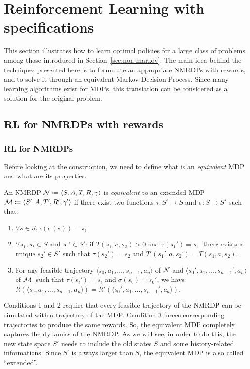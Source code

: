 \section[Reinforcement Learning with LDLf specifications]%
{Reinforcement Learning with \ldl{} specifications}

This section illustrates how to learn optimal policies for a large class of
problems among those introduced in Section~\ref{sec:non-markov}. The main idea
behind the techniques presented here is to formulate an appropriate NMRDPs
with \ldl{} rewards, and to solve it through an equivalent Markov Decision
Process. Since many learning algorithms exist for MDPs, this translation can
be considered as a solution for the original problem.


\subsection[RL for NMRDPs with LDLf rewards]%
{RL for NMRDPs with \ldl{} rewards}

\label{sec:nmrdp-solution}

\subsubsection*{RL for NMRDPs}

Before looking at the construction, we need to define what is an
\emph{equivalent} MDP and what are its properties.

\begin{definition}
	\cite{bib:nmrdp-logic-first} An NMRDP $\mathcal{N} \coloneqq \langle S, A, T, R,
	\gamma \rangle$ is \emph{equivalent} to an extended MDP $\mathcal{M} \coloneqq
	\langle S', A, T', R', \gamma' \rangle$ if there exist two functions
	$\tau: S' \to S$ and $\sigma: S \to S'$ such that:
	\begin{enumerate}
		\item $\forall s \in S : \tau(\sigma(s)) = s$;
		\item $\forall s_1, s_2 \in S$ and $s_1' \in S'$: if $T(s_1, a, s_2) > 0$
			and $\tau(s_1') = s_1$, there exists a unique $s_2' \in S'$ such that
			$\tau(s_2') = s_2$ and $T'(s_1', a, s_2') = T(s_1, a, s_2)$.
		\item For any feasible trajectory $\langle s_0, a_1, \dots, s_{n-1}, a_n
			\rangle$ of $\mathcal{N}$ and $\langle s_0', a_1, \dots, s_{n-1}', a_n
			\rangle$ of $\mathcal{M}$, such that $\tau(s_i') = s_i$ and $\sigma(s_0) =
			s_0'$, we have $R(\langle s_0, a_1, \dots, s_{n-1}, a_n
			\rangle) = R'(\langle s_0', a_1, \dots, s_{n-1}', a_n \rangle)$.
	\end{enumerate}
\end{definition}
Conditions 1 and 2 require that every feasible trajectory of the NMRDP can be
simulated with a trajectory of the MDP. Condition 3 forces corresponding
trajectories to produce the same rewards. So, the equivalent MDP completely
captures the dynamics of the NMRDP. As we will see, in order to do this, the
new state space $S'$ needs to include the old states $S$ and some
history-related informations. Since $S'$ is always larger than $S$, the
equivalent MDP is also called ``extended''.

